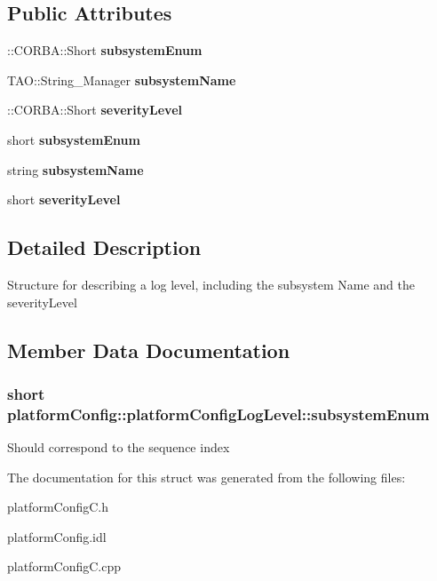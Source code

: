 \subsection*{Public Attributes}
\begin{DoxyCompactItemize}
\item 
\+::C\+O\+R\+B\+A\+::\+Short {\bfseries subsystem\+Enum}\label{structplatformConfig_1_1platformConfigLogLevel_aae6e2a184a596d223318a70c1d7f2a0a}

\item 
T\+A\+O\+::\+String\+\_\+\+Manager {\bfseries subsystem\+Name}\label{structplatformConfig_1_1platformConfigLogLevel_a4923e4ecce8757ed6254247cc072ba07}

\item 
\+::C\+O\+R\+B\+A\+::\+Short {\bfseries severity\+Level}\label{structplatformConfig_1_1platformConfigLogLevel_ac707db63df3f5d43f3d6e61ca1f1df3e}

\item 
short {\bf subsystem\+Enum}
\item 
string {\bfseries subsystem\+Name}\label{structplatformConfig_1_1platformConfigLogLevel_a6f8d827087c211707640d185e3d8a25b}

\item 
short {\bfseries severity\+Level}\label{structplatformConfig_1_1platformConfigLogLevel_a84705882c81732f2fb20504adee2d01f}

\end{DoxyCompactItemize}


\subsection{Detailed Description}
Structure for describing a log level, including the subsystem Name and the severity\+Level 

\subsection{Member Data Documentation}
\subsubsection[{subsystem\+Enum}]{\setlength{\rightskip}{0pt plus 5cm}short platform\+Config\+::platform\+Config\+Log\+Level\+::subsystem\+Enum}\label{structplatformConfig_1_1platformConfigLogLevel_a82cb68598c87180cfd27371e39f5ce72}
Should correspond to the sequence index 

The documentation for this struct was generated from the following files\+:\begin{DoxyCompactItemize}
\item 
platform\+Config\+C.\+h\item 
platform\+Config.\+idl\item 
platform\+Config\+C.\+cpp\end{DoxyCompactItemize}
